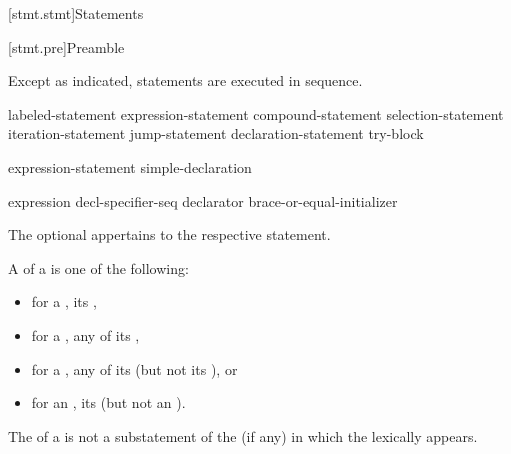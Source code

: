 [stmt.stmt]{Statements}%



[stmt.pre]{Preamble}

\pnum
Except as indicated, statements are executed in sequence.

\begin{bnf}
\br
    labeled-statement\br
     expression-statement\br
     compound-statement\br
     selection-statement\br
     iteration-statement\br
     jump-statement\br
    declaration-statement\br
     try-block
\end{bnf}

\begin{bnf}
\br
    expression-statement\br
    simple-declaration
\end{bnf}

\begin{bnf}
\br
    expression\br
     decl-specifier-seq declarator brace-or-equal-initializer
\end{bnf}

The optional  appertains to the respective statement.

\pnum
A  of a  is one of the following:
\begin{itemize}
\item
  for a , its ,
\item
  for a , any  of its ,
\item
  for a , any of its  (but not its ), or
\item
  for an , its  (but not an ).
\end{itemize}
\begin{note}
The  of a 
is not a substatement of the  (if any)
in which the  lexically appears.
\end{note}

